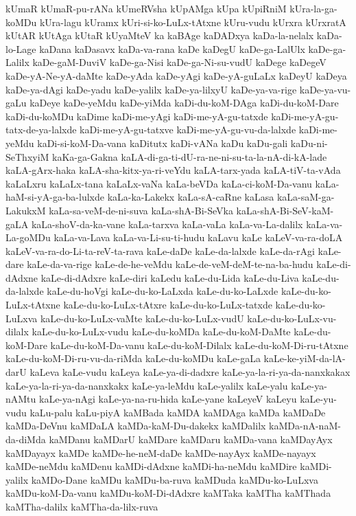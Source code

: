 {kUmaR
kUmaR-pu-rANa
kUmeRVsha
kUpAMga
kUpa
kUpiRniM
kUra-la-ga-koMDu
kUra-lagu
kUramx
kUri-si-ko-LuLx-tAtxne
kUru-vudu
kUrxra
kUrxratA
kUtAR
kUtAga
kUtaR
kUyaMteV
ka
kaBAge
kaDADxya
kaDa-la-nelalx
kaDa-lo-Lage
kaDana
kaDasavx
kaDa-va-rana
kaDe
kaDegU
kaDe-ga-LalUlx
kaDe-ga-Lalilx
kaDe-gaM-DuviV
kaDe-ga-Nisi
kaDe-ga-Ni-su-vudU
kaDege
kaDegeV
kaDe-yA-Ne-yA-daMte
kaDe-yAda
kaDe-yAgi
kaDe-yA-guLaLx
kaDeyU
kaDeya
kaDe-ya-dAgi
kaDe-yadu
kaDe-yalilx
kaDe-ya-lilxyU
kaDe-ya-va-rige
kaDe-ya-vu-gaLu
kaDeye
kaDe-yeMdu
kaDe-yiMda
kaDi-du-koM-DAga
kaDi-du-koM-Dare
kaDi-du-koMDu
kaDime
kaDi-me-yAgi
kaDi-me-yA-gu-tatxde
kaDi-me-yA-gu-tatx-de-ya-lalxde
kaDi-me-yA-gu-tatxve
kaDi-me-yA-gu-vu-da-lalxde
kaDi-me-yeMdu
kaDi-si-koM-Da-vana
kaDitutx
kaDi-vANa
kaDu
kaDu-gali
kaDu-ni-SeThxyiM
kaKa-ga-Gakna
kaLA-di-ga-ti-dU-ra-ne-ni-su-ta-la-nA-di-kA-lade
kaLA-gArx-haka
kaLA-sha-kitx-ya-ri-veYdu
kaLA-tarx-yada
kaLA-tiV-ta-vAda
kaLaLxru
kaLaLx-tana
kaLaLx-vaNa
kaLa-beVDa
kaLa-ci-koM-Da-vanu
kaLa-haM-si-yA-ga-ba-lulxde
kaLa-ka-Lakekx
kaLa-sA-caRne
kaLasa
kaLa-saM-ga-LakukxM
kaLa-sa-veM-de-ni-suva
kaLa-shA-Bi-SeVka
kaLa-shA-Bi-SeV-kaM-gaLA
kaLa-shoV-da-ka-vane
kaLa-tarxva
kaLa-vaLa
kaLa-va-La-dalilx
kaLa-va-La-goMDu
kaLa-va-Lava
kaLa-va-Li-su-ti-hudu
kaLavu
kaLe
kaLeV-va-ra-doLA
kaLeV-va-ra-do-Li-ta-reV-ta-rava
kaLe-daDe
kaLe-da-lalxde
kaLe-da-rAgi
kaLe-dare
kaLe-da-va-rige
kaLe-de-he-veMdu
kaLe-de-veM-deM-te-na-ba-hudu
kaLe-di-dAdxne
kaLe-di-dAdxre
kaLe-diri
kaLedu
kaLe-du-Lida
kaLe-du-Liva
kaLe-du-da-lalxde
kaLe-du-hoVgi
kaLe-du-ko-LaLxda
kaLe-du-ko-LaLxde
kaLe-du-ko-LuLx-tAtxne
kaLe-du-ko-LuLx-tAtxre
kaLe-du-ko-LuLx-tatxde
kaLe-du-ko-LuLxva
kaLe-du-ko-LuLx-vaMte
kaLe-du-ko-LuLx-vudU
kaLe-du-ko-LuLx-vu-dilalx
kaLe-du-ko-LuLx-vudu
kaLe-du-koMDa
kaLe-du-koM-DaMte
kaLe-du-koM-Dare
kaLe-du-koM-Da-vanu
kaLe-du-koM-Dilalx
kaLe-du-koM-Di-ru-tAtxne
kaLe-du-koM-Di-ru-vu-da-riMda
kaLe-du-koMDu
kaLe-gaLa
kaLe-ke-yiM-da-lA-darU
kaLeva
kaLe-vudu
kaLeya
kaLe-ya-di-dadxre
kaLe-ya-la-ri-ya-da-nanxkakax
kaLe-ya-la-ri-ya-da-nanxkakx
kaLe-ya-leMdu
kaLe-yalilx
kaLe-yalu
kaLe-ya-nAMtu
kaLe-ya-nAgi
kaLe-ya-na-ru-hida
kaLe-yane
kaLeyeV
kaLeyu
kaLe-yu-vudu
kaLu-palu
kaLu-piyA
kaMBada
kaMDA
kaMDAga
kaMDa
kaMDaDe
kaMDa-DeVnu
kaMDaLA
kaMDa-kaM-Du-dakekx
kaMDalilx
kaMDa-nA-naM-da-diMda
kaMDanu
kaMDarU
kaMDare
kaMDaru
kaMDa-vana
kaMDayAyx
kaMDayayx
kaMDe
kaMDe-he-neM-daDe
kaMDe-nayAyx
kaMDe-nayayx
kaMDe-neMdu
kaMDenu
kaMDi-dAdxne
kaMDi-ha-neMdu
kaMDire
kaMDi-yalilx
kaMDo-Dane
kaMDu
kaMDu-ba-ruva
kaMDuda
kaMDu-ko-LuLxva
kaMDu-koM-Da-vanu
kaMDu-koM-Di-dAdxre
kaMTaka
kaMTha
kaMThada
kaMTha-dalilx
kaMTha-da-lilx-ruva
}
